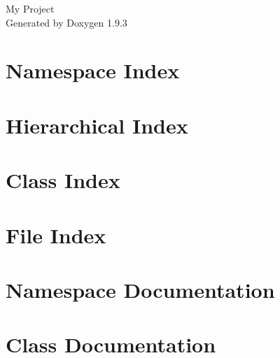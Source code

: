 \documentclass[twoside]{book}
\newcommand{\+}{\discretionary{\mbox{\scriptsize$\hookleftarrow$}}{}{}}
\newcommand{\clearemptydoublepage}{%
    \newpage{\pagestyle{empty}\cleardoublepage}%
  }
\begin{document}
  \raggedbottom
    \hypersetup{pageanchor=false,
                bookmarksnumbered=true,
                pdfencoding=unicode
               }
  \begin{titlepage}
  \vspace*{7cm}
  \begin{center}%
  {\Large My Project}\\
  \vspace*{1cm}
  {\large Generated by Doxygen 1.9.3}\\
  \end{center}
  \end{titlepage}
  \clearemptydoublepage
  \tableofcontents
  \clearemptydoublepage
  \hypersetup{pageanchor=true}
\chapter{Namespace Index}

\chapter{Hierarchical Index}

\chapter{Class Index}

\chapter{File Index}

\chapter{Namespace Documentation}

\chapter{Class Documentation}














\end{document}
